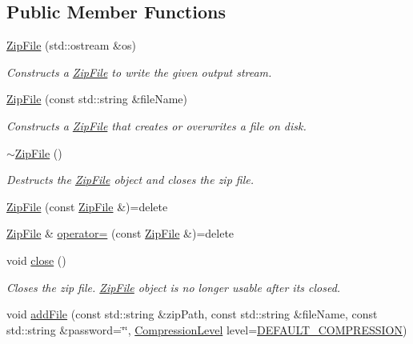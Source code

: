\subsection*{Public Member Functions}
\begin{DoxyCompactItemize}
\item 
\hyperlink{group___utility_module_gaeb5b4a5bdcfb3401601b79d5b2b8d67f}{Zip\+File} (std\+::ostream \&os)
\begin{DoxyCompactList}\small\item\em Constructs a \hyperlink{classdg_1_1deepcore_1_1_zip_file}{Zip\+File} to write the given output stream. \end{DoxyCompactList}\item 
\hyperlink{group___utility_module_gafa1ff9f05e738574c7ab39179c553a10}{Zip\+File} (const std\+::string \&file\+Name)
\begin{DoxyCompactList}\small\item\em Constructs a \hyperlink{classdg_1_1deepcore_1_1_zip_file}{Zip\+File} that creates or overwrites a file on disk. \end{DoxyCompactList}\item 
\hyperlink{group___utility_module_ga4a3d14bf12cdc92d728b1bee2ef3afbe}{$\sim$\+Zip\+File} ()
\begin{DoxyCompactList}\small\item\em Destructs the \hyperlink{classdg_1_1deepcore_1_1_zip_file}{Zip\+File} object and closes the zip file. \end{DoxyCompactList}\item 
\hyperlink{classdg_1_1deepcore_1_1_zip_file_a5a254be95e73344dd5abfad64aceeab5}{Zip\+File} (const \hyperlink{classdg_1_1deepcore_1_1_zip_file}{Zip\+File} \&)=delete
\item 
\hyperlink{classdg_1_1deepcore_1_1_zip_file}{Zip\+File} \& \hyperlink{classdg_1_1deepcore_1_1_zip_file_ab424ebe12558c54fb848df2fa015d8bd}{operator=} (const \hyperlink{classdg_1_1deepcore_1_1_zip_file}{Zip\+File} \&)=delete
\item 
void \hyperlink{group___utility_module_gab6e19571b30242e6604590e978a932ef}{close} ()
\begin{DoxyCompactList}\small\item\em Closes the zip file. \hyperlink{classdg_1_1deepcore_1_1_zip_file}{Zip\+File} object is no longer usable after it\textquotesingle{}s closed. \end{DoxyCompactList}\item 
void \hyperlink{group___utility_module_gabe05472ab2b9e7af516484c107dafe5a}{add\+File} (const std\+::string \&zip\+Path, const std\+::string \&file\+Name, const std\+::string \&password=\char`\"{}\char`\"{}, \hyperlink{classdg_1_1deepcore_1_1_zip_file_afbf537eaa2281817c203388707564bdd}{Compression\+Level} level=\hyperlink{classdg_1_1deepcore_1_1_zip_file_afbf537eaa2281817c203388707564bdda62b26dddf684026102b91f79a0848012}{D\+E\+F\+A\+U\+L\+T\+\_\+\+C\+O\+M\+P\+R\+E\+S\+S\+I\+ON})

\end{DoxyCompactItemize}
